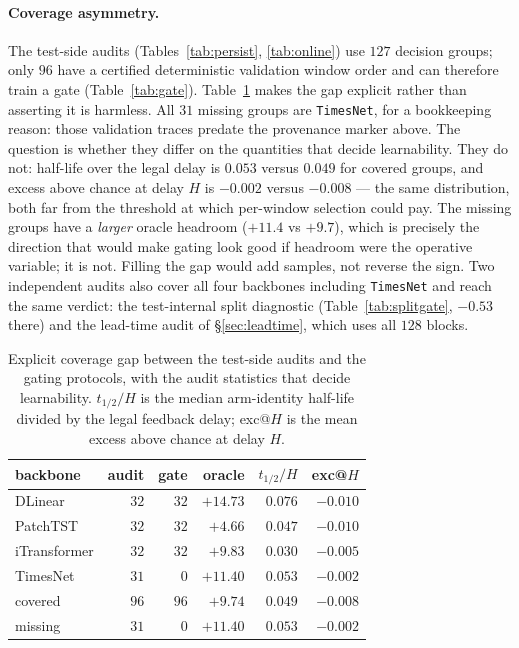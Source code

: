 \documentclass[a4paper,fleqn]{cas-sc}
\newcommand{\arm}[1]{\texttt{#1}}
\begin{document}
\paragraph{Coverage asymmetry.}
The test-side audits (Tables~\ref{tab:persist}, \ref{tab:online}) use $127$
decision groups; only $96$ have a certified deterministic validation window order
and can therefore train a gate (Table~\ref{tab:gate}). Table~\ref{tab:coverage}
makes the gap explicit rather than asserting it is harmless. All $31$ missing
groups are \arm{TimesNet}, for a bookkeeping reason: those validation traces
predate the provenance marker above. The question is whether they differ on the
quantities that decide learnability. They do not: half-life over the legal delay
is $0.053$ versus $0.049$ for covered groups, and excess above chance at delay
$H$ is $-0.002$ versus $-0.008$ --- the same distribution, both far from the
threshold at which per-window selection could pay. The missing groups have a
\emph{larger} oracle headroom ($+11.4$ vs $+9.7$), which is precisely the
direction that would make gating look good if headroom were the operative
variable; it is not. Filling the gap would add samples, not reverse the sign.
Two independent audits also cover all four backbones including \arm{TimesNet}
and reach the same verdict: the test-internal split diagnostic
(Table~\ref{tab:splitgate}, $-0.53$ there) and the lead-time audit of
\S\ref{sec:leadtime}, which uses all $128$ blocks.

\begin{table}[t]
\centering\small
\caption{Explicit coverage gap between the test-side audits and the
gating protocols, with the audit statistics that decide learnability.
$t_{1/2}/H$ is the median arm-identity half-life divided by the legal feedback
delay; exc@$H$ is the mean excess above chance at delay $H$.}
\label{tab:coverage}
\begin{tabular}{lrrrrr}
\toprule
backbone & audit & gate & oracle & $t_{1/2}/H$ & exc@$H$ \\
\midrule
DLinear      & $32$ & $32$ & $+14.73$ & $0.076$ & $-0.010$ \\
PatchTST     & $32$ & $32$ & $+4.66$  & $0.047$ & $-0.010$ \\
iTransformer & $32$ & $32$ & $+9.83$  & $0.030$ & $-0.005$ \\
TimesNet     & $31$ & $0$  & $+11.40$ & $0.053$ & $-0.002$ \\
\midrule
covered      & $96$ & $96$ & $+9.74$  & $0.049$ & $-0.008$ \\
missing      & $31$ & $0$  & $+11.40$ & $0.053$ & $-0.002$ \\
\bottomrule
\end{tabular}
\end{table}
\end{document}

